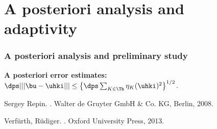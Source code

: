 \documentclass[10 pt]{beamer}
\begin{document}
\section{A posteriori analysis and adaptivity}
\begin{frame}

\frametitle{A posteriori analysis and preliminary study}
\alert{\textbf{A posteriori error estimates:}}
$\dps |||\bu-\uhki||| \leq \left\{\dps \sum_{\substack{K \in\Th}} \eta_K(\uhki)^2\right\}^{1/2}$.\\

\scriptsize{
\begin{thebibliography}{10}
Sergey Repin.
.
\newblock Walter de Gruyter GmbH \& Co. KG, Berlin, 2008.
\end{thebibliography}
}

\scriptsize{
\begin{thebibliography}{10}
Verf\"urth, R\"udiger.
.
\newblock Oxford University Press, 2013.
\end{thebibliography}
}


\end{frame}
\end{document}

